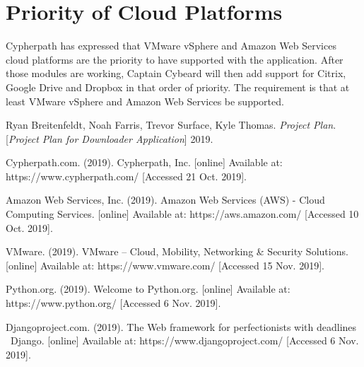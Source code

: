\documentclass{article}
\begin{document}
    \section{Priority of Cloud Platforms}
    Cypherpath has expressed that VMware vSphere and Amazon Web Services cloud platforms are the priority to have supported with the application. After those modules are working, Captain Cybeard will then add support
    for Citrix, Google Drive and Dropbox in that order of priority. The requirement is that at least VMware vSphere and Amazon Web Services be supported.
    



    \newpage
    \begin{thebibliography}{6}
    Ryan Breitenfeldt, Noah Farris, Trevor Surface, Kyle Thomas.
    \textit{Project Plan}.
    [\textit{Project Plan for Downloader Application}] 2019.

    Cypherpath.com. (2019). Cypherpath, Inc. [online] Available at: https://www.cypherpath.com/ [Accessed 21 Oct. 2019].

    Amazon Web Services, Inc. (2019). Amazon Web Services (AWS) - Cloud Computing Services. [online] Available at: https://aws.amazon.com/ [Accessed 10 Oct. 2019].

    VMware. (2019). VMware – Cloud, Mobility, Networking \& Security Solutions. [online] Available at: https://www.vmware.com/ [Accessed 15 Nov. 2019].

    Python.org. (2019). Welcome to Python.org. [online] Available at: https://www.python.org/ [Accessed 6 Nov. 2019].

    Djangoproject.com. (2019). The Web framework for perfectionists with deadlines \textbar\ Django. [online] Available at: https://www.djangoproject.com/ [Accessed 6 Nov. 2019].
    \end{thebibliography}
\end{document}
